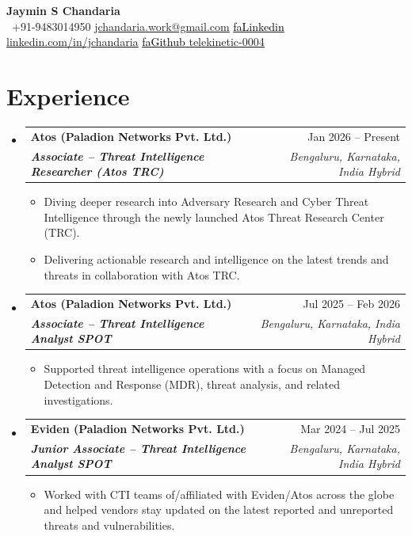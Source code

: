 \documentclass[letterpaper,11pt]{article}
\makeatletter
\newcommand{\EmployerStyle}{\bfseries} %
\newcommand{\EmployerSize}{}           %
\renewcommand{\EmployerSize}{\large} %
\newcommand{\resumeItem}[1]{%
  \item \small #1%
}
\newcommand{\resumeSubheading}[4]{%
  \vspace{1pt}\item
  \begin{tabularx}{0.98\textwidth}[t]{@{}Xr@{}}
    {\EmployerSize\EmployerStyle #1} & {\small #2} \\
    {\itshape\footnotesize #3} & {\itshape\footnotesize #4} \\
  \end{tabularx}\vspace{-3pt}%
}
\newcommand{\resumeSubHeadingListStart}{%
  \begin{itemize}[leftmargin=0.15in, label={}, topsep=2pt, partopsep=0pt]%
}
\newcommand{\resumeSubHeadingListEnd}{\end{itemize}}
\newcommand{\resumeItemListStart}{\begin{itemize}[leftmargin=*, itemsep=3pt, topsep=3pt]}
\newcommand{\resumeItemListEnd}{\end{itemize}\vspace{-3pt}}
\newcommand{\seticon}[1]{\textcolor{Black}{\csname #1\endcsname}}
\makeatother
\begin{document}
\begin{center}
    \textbf{\Huge Jaymin S Chandaria} \\ \vspace{1pt}
     \ \small +91-9483014950 \quad
    \href{mailto:jchandaria.work@gmail.com}{ \underline{jchandaria.work@gmail.com}} \quad
    \href{https://www.linkedin.com/in/jchandaria}{\seticon{faLinkedin} \underline{linkedin.com/in/jchandaria}} \quad
    \href{https://github.com/telekinetic-0004}{\seticon{faGithub} \underline{telekinetic-0004}}
\end{center}

\section{Experience}
\resumeSubHeadingListStart

\resumeSubheading
  {Atos (Paladion Networks Pvt. Ltd.)}{Jan 2026 -- Present}
  {\bfseries Associate -- Threat Intelligence Researcher (Atos TRC)}{Bengaluru, Karnataka, India \textbar{} Hybrid}
  \resumeItemListStart
    \resumeItem{Diving deeper research into Adversary Research and Cyber Threat Intelligence through the newly launched Atos Threat Research Center (TRC).}
    \resumeItem{Delivering actionable research and intelligence on the latest trends and threats in collaboration with Atos TRC.}
  \resumeItemListEnd

\resumeSubheading
  {Atos (Paladion Networks Pvt. Ltd.)}{Jul 2025 -- Feb 2026}
  {\bfseries Associate -- Threat Intelligence Analyst {\scriptsize \faIcon{star} SPOT}}{Bengaluru, Karnataka, India \textbar{} Hybrid}
  \resumeItemListStart
    \resumeItem{Supported threat intelligence operations with a focus on Managed Detection and Response (MDR), threat analysis, and related investigations.}
  \resumeItemListEnd

\resumeSubheading
  {Eviden (Paladion Networks Pvt. Ltd.)}{Mar 2024 -- Jul 2025}
  {\bfseries Junior Associate -- Threat Intelligence Analyst {\scriptsize \faIcon{star}\faIcon{star} SPOT}}{Bengaluru, Karnataka, India \textbar{} Hybrid}
  \resumeItemListStart
    \resumeItem{Worked with CTI teams of/affiliated with Eviden/Atos across the globe and helped vendors stay updated on the latest reported and unreported threats and vulnerabilities.}
  \resumeItemListEnd

\resumeSubHeadingListEnd

\end{document}
